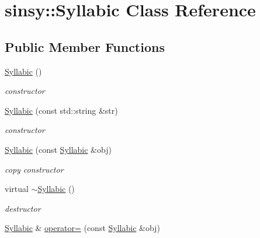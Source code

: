 \hypertarget{classsinsy_1_1Syllabic}{\section{sinsy\-:\-:\-Syllabic \-Class \-Reference}
\label{classsinsy_1_1Syllabic}
}
\subsection*{\-Public \-Member \-Functions}
\begin{DoxyCompactItemize}
\item 
\hypertarget{classsinsy_1_1Syllabic_a422090601b0c5dedcb6a302f75ff54e9}{\hyperlink{classsinsy_1_1Syllabic_a422090601b0c5dedcb6a302f75ff54e9}{\-Syllabic} ()}\label{classsinsy_1_1Syllabic_a422090601b0c5dedcb6a302f75ff54e9}

\begin{DoxyCompactList}\small\item\em constructor \end{DoxyCompactList}\item 
\hypertarget{classsinsy_1_1Syllabic_a3e5334cbfc18deb457430f3bce03fe8a}{\hyperlink{classsinsy_1_1Syllabic_a3e5334cbfc18deb457430f3bce03fe8a}{\-Syllabic} (const std\-::string \&str)}\label{classsinsy_1_1Syllabic_a3e5334cbfc18deb457430f3bce03fe8a}

\begin{DoxyCompactList}\small\item\em constructor \end{DoxyCompactList}\item 
\hypertarget{classsinsy_1_1Syllabic_a96d3a8a7b0da42ec0e9d0b5de6789012}{\hyperlink{classsinsy_1_1Syllabic_a96d3a8a7b0da42ec0e9d0b5de6789012}{\-Syllabic} (const \hyperlink{classsinsy_1_1Syllabic}{\-Syllabic} \&obj)}\label{classsinsy_1_1Syllabic_a96d3a8a7b0da42ec0e9d0b5de6789012}

\begin{DoxyCompactList}\small\item\em copy constructor \end{DoxyCompactList}\item 
\hypertarget{classsinsy_1_1Syllabic_a059a986d8f998a9d7c5da6479c732246}{virtual \hyperlink{classsinsy_1_1Syllabic_a059a986d8f998a9d7c5da6479c732246}{$\sim$\-Syllabic} ()}\label{classsinsy_1_1Syllabic_a059a986d8f998a9d7c5da6479c732246}

\begin{DoxyCompactList}\small\item\em destructor \end{DoxyCompactList}\item 
\hypertarget{classsinsy_1_1Syllabic_a68868d0713d7220d522b7fac79784329}{\hyperlink{classsinsy_1_1Syllabic}{\-Syllabic} \& \hyperlink{classsinsy_1_1Syllabic_a68868d0713d7220d522b7fac79784329}{operator=} (const \hyperlink{classsinsy_1_1Syllabic}{\-Syllabic} \&obj)}\label{classsinsy_1_1Syllabic_a68868d0713d7220d522b7fac79784329}


\end{DoxyCompactItemize}

